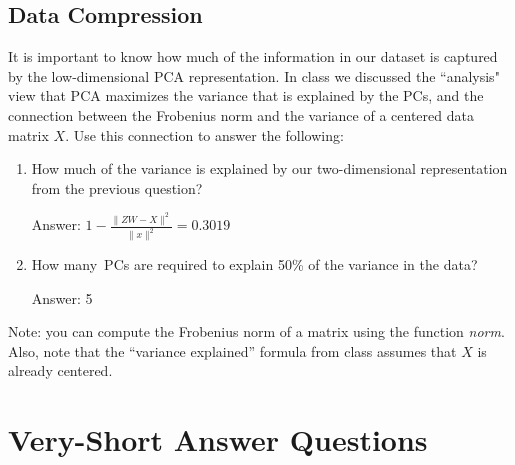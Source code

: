 \documentclass{article}
\def\ans#1{\par\gre{Answer: #1}}
\def\blu#1{{\color{blu}#1}}
\def\gre#1{{\color{gre}#1}}
\def\enum#1{\begin{enumerate}#1\end{enumerate}}
\begin{document}
\subsection{Data Compression}

It is important to know how much of the information in our dataset is captured by the low-dimensional PCA representation.
In class we discussed the ``analysis" view that PCA maximizes the variance that is explained by the PCs, and the connection between the Frobenius norm and the variance of a centered data matrix $X$. Use this connection to answer the following:
\blu{\enum{
\item How much of the variance is explained by our two-dimensional representation from the previous question?
\ans{$1 - \frac {\|ZW - X\|^2} {\|x\|^2} =0.3019$} 
\item How many\ PCs are required to explain 50\% of the variance in the data?
\ans{5}
}}
Note: you can compute the Frobenius norm of a matrix using the function \emph{norm}. Also, note that the ``variance explained'' formula from class assumes that $X$ is already centered.



\section{Very-Short Answer Questions}
\end{document}
